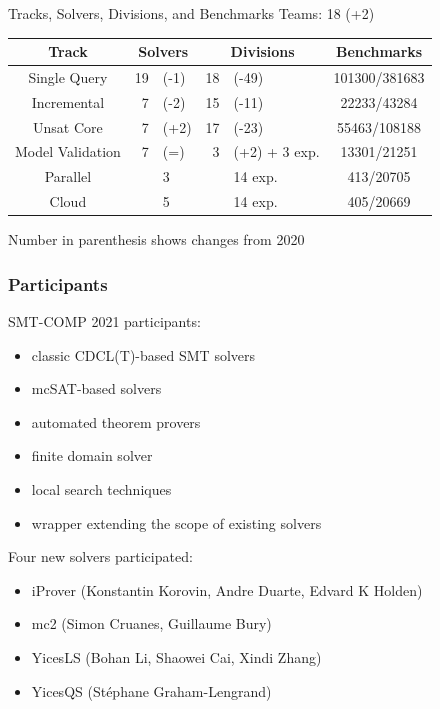 \documentclass[table]{beamer}
\begin{document}
\begin{frame}{Tracks, Solvers, Divisions, and Benchmarks}
  Teams: 18 (+2)
  \bigskip

  \begin{tabular}{c|r@{}l|r@{}l|c}
    Track & \multicolumn{2}{c|}{Solvers} & \multicolumn{2}{c|}{Divisions}  & Benchmarks \\
    \hline
    Single Query  &  19&(-1)  & 18&(-49)  & 101300/381683 \\
    Incremental &  7&(-2)   & 15&(-11)  & 22233/43284   \\
    Unsat Core  &  7&(+2)   & 17&(-23)  & 55463/108188  \\
    Model Validation  &  7&(=)    &  3&(+2) + 3 exp.  & 13301/21251  \\
    Parallel &   &3      &   &14 exp.  & 413/20705 \\
    Cloud & &5      &   &14 exp.  & 405/20669 \\
  \end{tabular}
  \bigskip

  Number in parenthesis shows changes from 2020
\end{frame}

\begin{frame}
  \frametitle{Participants}

  SMT-COMP 2021 participants:
  \begin{itemize}
  \item classic CDCL(T)-based SMT solvers
  \item mcSAT-based solvers
  \item automated theorem provers
  \item finite domain solver
  \item local search techniques
  \item wrapper extending the scope of existing solvers
  \end{itemize}

  \bigskip
  Four new solvers participated:
  \begin{itemize}
  \item iProver (Konstantin Korovin, Andre Duarte, Edvard K Holden)
  \item mc2 (Simon Cruanes, Guillaume Bury)
  \item YicesLS (Bohan Li, Shaowei Cai, Xindi Zhang)
  \item YicesQS (Stéphane Graham-Lengrand)
  \end{itemize}

\end{frame}
\end{document}
